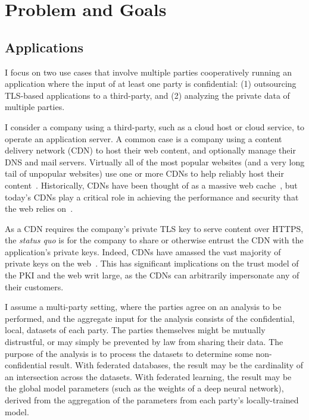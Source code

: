 \section{Problem and Goals}
\label{sec:background}

\subsection{Applications}

I focus on two use cases that involve multiple parties cooperatively running
an application where the input of at least one party is confidential:
(1) outsourcing TLS-based applications to a third-party, and (2)
analyzing the private data of multiple parties.


%
I consider a company using a third-party, such as a cloud host or cloud
service, to operate an application server.
%
A common case is a company using a content delivery network (CDN) to
host their web content, and optionally manage their DNS and mail servers.
%
Virtually all of the most popular websites (and a very long tail
of unpopular websites) use one or more CDNs to help reliably host
their content~\cite{key-sharing}. 
%
Historically, CDNs have been thought of as a massive web
cache~\cite{cdn-on-demand}, but today’s CDNs play a critical role in achieving
the performance and security that the web relies on~\cite{securing-cdns}.



As a CDN requires the company's private TLS key to serve content over HTTPS,
the \emph{status quo} is for the company to share or otherwise entrust the CDN
with the application's private keys.
%
Indeed, CDNs have amassed the vast majority of private keys on the
web~\cite{key-sharing,when-https-meets-cdn}.
%
This has significant implications on the trust model of the PKI and the web
writ large, as the CDNs  can arbitrarily impersonate any of their customers.


%
I assume a multi-party setting, where the parties agree on an analysis to be
performed, and the aggregate input for the analysis consists of the
confidential, local, datasets of each party.
% 
The parties themselves might be mutually distrustful, or may simply be
prevented by law from sharing their data.
%
The purpose of the analysis is to process the datasets to determine some
non-confidential result.
%
With federated databases, the result may be the cardinality of an intersection
across the datasets.
%
With federated learning, the result may be the global model parameters (such
as the weights of a deep neural network), derived from the aggregation of the
parameters from each party's locally-trained model.



